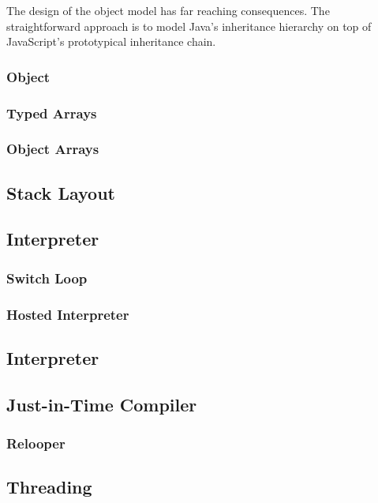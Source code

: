 \documentclass{acm_proc_article-sp}
\begin{document}
The design of the object model has far reaching consequences.
The straightforward approach is to model Java's inheritance hierarchy on top of JavaScript's prototypical inheritance chain.

\subsubsection{Object}

\subsubsection{Typed Arrays}

\subsubsection{Object Arrays}

\subsection{Stack Layout}

\subsection{Interpreter}

\subsubsection{Switch Loop}

\subsubsection{Hosted Interpreter}

\subsection{Interpreter}

\subsection{Just-in-Time Compiler}

\subsubsection{Relooper}

\subsection{Threading}
\end{document}

